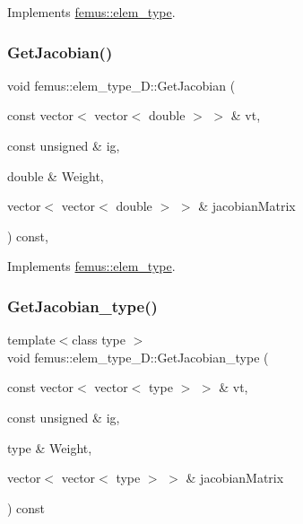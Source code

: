 Implements \mbox{\hyperlink{classfemus_1_1elem__type_aa8e617c54dd774ffca5d305605552af7}{femus\+::elem\+\_\+type}}.

\mbox{\label{classfemus_1_1elem__type__1_d_ad39cd6dbe648f384fa1be74d5ceec783}} 
\subsubsection{\texorpdfstring{Get\+Jacobian()}{GetJacobian()}\hspace{0.1cm}{\footnotesize\ttfamily [2/2]}}
{\footnotesize\ttfamily void femus\+::elem\+\_\+type\+\_\+D\+::\+Get\+Jacobian (\begin{DoxyParamCaption}\item[{const vector$<$ vector$<$ double $>$ $>$ \&}]{vt,  }\item[{const unsigned \&}]{ig,  }\item[{double \&}]{Weight,  }\item[{vector$<$ vector$<$ double $>$ $>$ \&}]{jacobian\+Matrix }\end{DoxyParamCaption}) const\hspace{0.3cm}{\ttfamily [inline]}, {\ttfamily [virtual]}}



Implements \mbox{\hyperlink{classfemus_1_1elem__type_a6c883b7946e55db8783fd0177546610a}{femus\+::elem\+\_\+type}}.

\mbox{\label{classfemus_1_1elem__type__1_d_a4061091e86269a2ae013083b3c46e5ad}} 
\subsubsection{\texorpdfstring{Get\+Jacobian\+\_\+type()}{GetJacobian\_type()}}
{\footnotesize\ttfamily template$<$class type $>$ \\
void femus\+::elem\+\_\+type\+\_\+D\+::\+Get\+Jacobian\+\_\+type (\begin{DoxyParamCaption}\item[{const vector$<$ vector$<$ type $>$ $>$ \&}]{vt,  }\item[{const unsigned \&}]{ig,  }\item[{type \&}]{Weight,  }\item[{vector$<$ vector$<$ type $>$ $>$ \&}]{jacobian\+Matrix }\end{DoxyParamCaption}) const}

